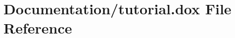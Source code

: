 \hypertarget{tutorial_8dox}{}\section{Documentation/tutorial.dox File Reference}
\label{tutorial_8dox}

